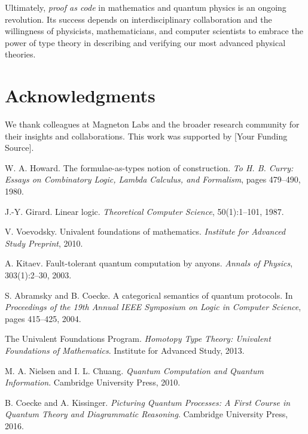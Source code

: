 \documentclass[12pt]{article}
\begin{document}
Ultimately, \emph{proof as code} in mathematics and quantum physics is an ongoing revolution. Its success depends on interdisciplinary collaboration and the willingness of physicists, mathematicians, and computer scientists to embrace the power of type theory in describing and verifying our most advanced physical theories.

\section*{Acknowledgments}
We thank colleagues at Magneton Labs and the broader research community for their insights and collaborations. This work was supported by [Your Funding Source].


\begin{thebibliography}{99}

W. A. Howard.
\newblock The formulae-as-types notion of construction.
\newblock \emph{To H. B. Curry: Essays on Combinatory Logic, Lambda Calculus, and Formalism}, pages 479--490, 1980.

J.-Y. Girard.
\newblock Linear logic.
\newblock \emph{Theoretical Computer Science}, 50(1):1--101, 1987.

V. Voevodsky.
\newblock Univalent foundations of mathematics.
\newblock \emph{Institute for Advanced Study Preprint}, 2010.

A. Kitaev.
\newblock Fault-tolerant quantum computation by anyons.
\newblock \emph{Annals of Physics}, 303(1):2--30, 2003.

S. Abramsky and B. Coecke.
\newblock A categorical semantics of quantum protocols.
\newblock In \emph{Proceedings of the 19th Annual IEEE Symposium on Logic in Computer Science}, pages 415--425, 2004.

The Univalent Foundations Program.
\newblock \emph{Homotopy Type Theory: Univalent Foundations of Mathematics}.
\newblock Institute for Advanced Study, 2013.

M. A. Nielsen and I. L. Chuang.
\newblock \emph{Quantum Computation and Quantum Information}.
\newblock Cambridge University Press, 2010.

B. Coecke and A. Kissinger.
\newblock \emph{Picturing Quantum Processes: A First Course in Quantum Theory and Diagrammatic Reasoning}.
\newblock Cambridge University Press, 2016.


\end{thebibliography}
\end{document}
